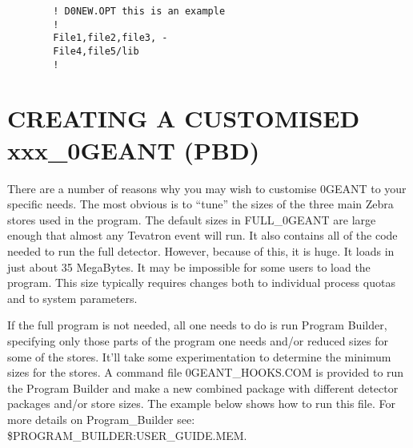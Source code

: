 \begin{verbatim}
        ! D0NEW.OPT this is an example
        !
        File1,file2,file3, -
        File4,file5/lib
        !
\end{verbatim}

\section{CREATING A CUSTOMISED xxx\_\D0GEANT (PBD)}
\label{pbd}

There are a number of reasons why you may wish to customise \D0GEANT to your
specific needs. The most obvious is to ``tune'' the sizes of the three main Zebra
stores used in the program. The default sizes in FULL\_\D0GEANT are large
enough that almost any Tevatron event will run. It also contains all of the code
needed to run the full detector. However, because of this, it is huge. It loads
in just about 35 MegaBytes. It may be impossible for some users to load the
program. This size typically requires changes both to individual process quotas
and to system parameters.

If the full program is not needed, all one needs to do is run Program Builder,
specifying only those parts of the program one needs and/or reduced sizes for
some of the stores. It'll take some experimentation to determine the minimum
sizes for the stores. A command file \D0GEANT\_HOOKS.COM is provided to run
the Program Builder and make a new combined package with different detector
packages and/or store sizes.  The example below shows how to run this file.
For more details on Program\_Builder see: \$PROGRAM\_BUILDER:USER\_GUIDE.MEM.

